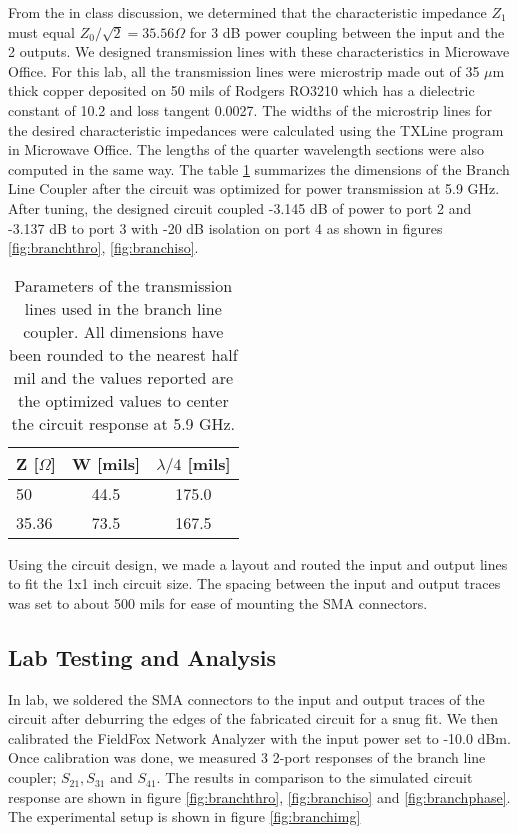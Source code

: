\documentclass[twocolumn, aps, apl]{revtex4-1}
\begin{document}
From the in class discussion, we determined that the characteristic impedance $Z_1$ must equal $Z_0/\sqrt{2} = 35.56 \Omega$ for 3 dB power coupling between the input and the 2 outputs. We designed transmission lines with these characteristics in Microwave Office. For this lab, all the transmission lines were microstrip made out of 35 $\mu$m thick copper deposited on 50 mils of Rodgers RO3210 which has a dielectric constant of 10.2 and loss tangent 0.0027. The widths of the microstrip lines for the desired characteristic impedances were calculated using the TXLine program in Microwave Office. The lengths of the quarter wavelength sections were also computed in the same way. The table \ref{tab:branch} summarizes the dimensions of the Branch Line Coupler after the circuit was optimized for power transmission at 5.9 GHz. After tuning, the designed circuit coupled -3.145 dB of power to port 2 and -3.137 dB to port 3 with -20 dB isolation on port 4 as shown in figures \ref{fig:branchthro}, \ref{fig:branchiso}.

\begin{table}
\centering
\begin{tabular}{l | c | c}
    \hline
    Z [$\Omega$] & W [mils] & $\lambda/4$ [mils] \\
    \hline
    50  & 44.5 & 175.0 \\
    35.36 & 73.5 & 167.5 \\
    \hline
\end{tabular}
    \caption{Parameters of the transmission lines used in the branch line coupler. All dimensions have been rounded to the nearest half mil and the values reported are the optimized values to center the circuit response at 5.9 GHz. }
    \label{tab:branch}
\end{table}

Using the circuit design, we made a layout and routed the input and output lines to fit the 1x1 inch circuit size. The spacing between the input and output traces was set to about 500 mils for ease of mounting the SMA connectors. 

\subsection{Lab Testing and Analysis}
In lab, we soldered the SMA connectors to the input and output traces of the circuit after deburring the edges of the fabricated circuit for a snug fit. We then calibrated the FieldFox Network Analyzer with the input power set to -10.0 dBm. Once calibration was done, we measured 3 2-port responses of the branch line coupler; $S_{21}, S_{31}$ and $S_{41}$. The results in comparison to the simulated circuit response are shown in figure \ref{fig:branchthro}, \ref{fig:branchiso} and \ref{fig:branchphase}. The experimental setup is shown in figure \ref{fig:branchimg}
\end{document}
